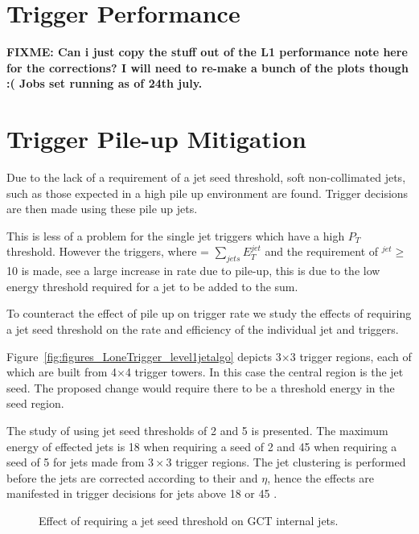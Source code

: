 \section{\Lone Trigger Performance} %
\label{sec:lone_trigger_performance}
\textbf{FIXME: Can i just copy the stuff out of the L1 performance note here 
for the corrections? I will need to re-make a bunch of the plots though :( Jobs 
set running as of 24th july.}

\section{\Lone Trigger Pile-up Mitigation} %
\label{sub:lone_trigger_pile_up_mitigation}
Due to the lack of a requirement of a jet seed threshold, soft non-collimated 
jets, such as those expected in a high pile up environment are found. Trigger 
decisions are then made using these pile up jets.

This is less of a problem for the single jet triggers which have a high $P_{T}$ 
threshold. However the \HT triggers, where \HT = $\sum_{jets}E_{T}^{jet}$ and 
the requirement of \ET$^{jet} \geq $10 \GeV is made, see a large increase in 
rate due to pile-up, this is due to the low energy  threshold required for a 
jet to be added to the \HT sum.

To counteract the effect of pile up on trigger rate we study the effects of 
requiring a jet seed threshold on the rate and efficiency of the individual jet 
and \HT triggers.

Figure~\ref{fig:figures_LoneTrigger_level1jetalgo} depicts 3$\times$3 trigger
regions, each of which are built from 4$\times$4 trigger towers. In this case 
the central region is the jet seed. The proposed change would require there to 
be a threshold energy in the seed region.

The study of using jet seed thresholds of 2 and 5 \GeV is presented. The 
maximum energy of effected jets is 18 \GeV when requiring a seed of 2 \GeV and 
45 \GeV when requiring a seed of 5 \GeV for jets made from $3\times3$ trigger 
regions. The jet clustering is performed before the \Lone jets are corrected 
according to their \ET and $\eta$, hence the effects are manifested in trigger 
decisions for \Lone jets above 18 or 45 \GeV.



\begin{figure}[h!]
    \centering
    \caption{Effect of requiring a jet seed threshold on GCT internal jets.}
    \label{fig:GCTrank}
\end{figure}


